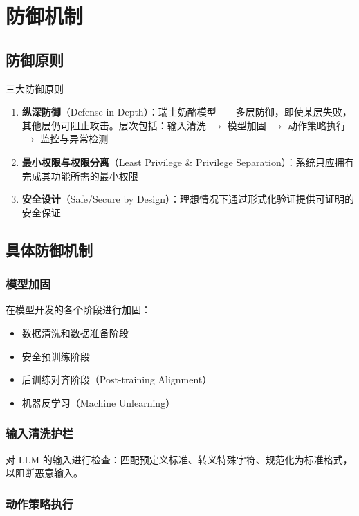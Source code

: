 \section{防御机制}

\subsection{防御原则}

\begin{importantbox}{三大防御原则}
\begin{enumerate}
    \item \textbf{纵深防御}（Defense in Depth）：瑞士奶酪模型——多层防御，即使某层失败，其他层仍可阻止攻击。层次包括：输入清洗 $\to$ 模型加固 $\to$ 动作策略执行 $\to$ 监控与异常检测
    \item \textbf{最小权限与权限分离}（Least Privilege \& Privilege Separation）：系统只应拥有完成其功能所需的最小权限
    \item \textbf{安全设计}（Safe/Secure by Design）：理想情况下通过形式化验证提供可证明的安全保证
\end{enumerate}
\end{importantbox}

\subsection{具体防御机制}

\subsubsection{模型加固}

在模型开发的各个阶段进行加固：
\begin{itemize}
    \item 数据清洗和数据准备阶段
    \item 安全预训练阶段
    \item 后训练对齐阶段（Post-training Alignment）
    \item 机器反学习（Machine Unlearning）
\end{itemize}

\subsubsection{输入清洗护栏}

对 LLM 的输入进行检查：匹配预定义标准、转义特殊字符、规范化为标准格式，以阻断恶意输入。

\subsubsection{动作策略执行}

